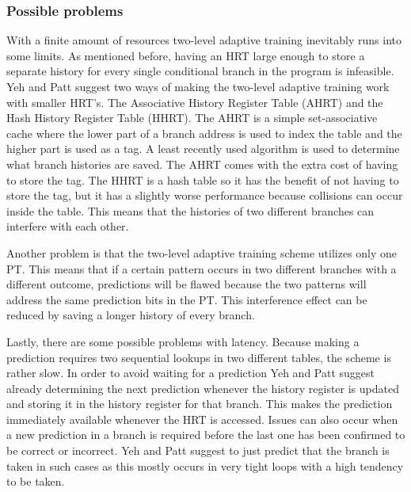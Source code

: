 \subsubsection{Possible problems}
With a finite amount of resources two-level adaptive training inevitably runs into some limits.
As mentioned before, having an HRT large enough to store a separate history for every single conditional branch in the program is infeasible.
Yeh and Patt suggest two ways of making the two-level adaptive training work with smaller HRT's.
The Associative History Register Table (AHRT) and the Hash History Register Table (HHRT).
The AHRT is a simple set-associative cache where the lower part of a branch address is used to index the table and the higher part is used as a tag.
A least recently used algorithm is used to determine what branch histories are saved.
The AHRT comes with the extra cost of having to store the tag.
The HHRT is a hash table so it has the benefit of not having to store the tag, but it has a slightly worse performance because collisions can occur inside the table.
This means that the histories of two different branches can interfere with each other.

Another problem is that the two-level adaptive training scheme utilizes only one PT.
This means that if a certain pattern occurs in two different branches with a different outcome, predictions will be flawed because the two patterns will address the same prediction bits in the PT.
This interference effect can be reduced by saving a longer history of every branch.

Lastly, there are some possible problems with latency.
Because making a prediction requires two sequential lookups in two different tables, the scheme is rather slow.
In order to avoid waiting for a prediction Yeh and Patt suggest already determining the next prediction whenever the history register is updated and storing it in the history register for that branch.
This makes the prediction immediately available whenever the HRT is accessed.
Issues can also occur when a new prediction in a branch is required before the last one has been confirmed to be correct or incorrect.
Yeh and Patt suggest to just predict that the branch is taken in such cases as this mostly occurs in very tight loops with a high tendency to be taken.